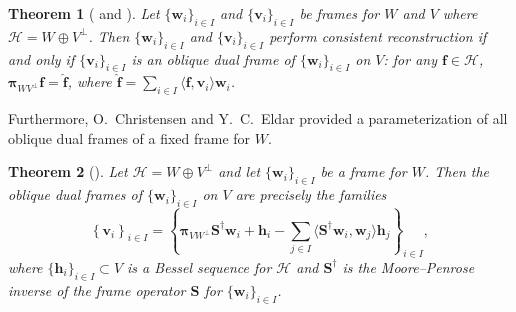 \documentclass{amsart}
\numberwithin{equation}{section}
\newcommand{\bpi}{{\boldsymbol{\pi}}}
\theoremstyle{plain}
\newtheorem{theorem}{Theorem}[section]
\theoremstyle{remark}
\theoremstyle{definition}
\begin{document}
\begin{theorem}[{\cite[Theorem 1]{eldar2003sampling} and \cite[Lemma 3.1]{christensen2004oblique}}] \label{thm:Oblique_dual_characterization}
    Let $\{\mathbf{w}_i\}_{i\in I}$ and $\{\mathbf{v}_i\}_{i\in I}$ be frames for $W$ and $V$ where $\mathcal{H} = W \oplus V^\perp$. Then $\{\mathbf{w}_i\}_{i\in I}$ and $\{\mathbf{v}_i\}_{i\in I}$ perform consistent reconstruction if and only if $\{\mathbf{v}_i\}_{i\in I}$ is an \emph{oblique dual frame} of $\{\mathbf{w}_i\}_{i\in I}$ on $V$: for any $\mathbf{f} \in \mathcal{H}$, $\bpi_{W V^\perp} \mathbf{f} = \hat{\mathbf{f}}$, where $ \hat{\mathbf{f}}= \sum_{i\in I} \langle \mathbf{f}, \mathbf{v}_i \rangle \mathbf{w}_i$.
\end{theorem}


Furthermore, O.~Christensen and Y.~C.~Eldar \cite{christensen2004oblique} provided a parameterization of all oblique dual frames of a fixed frame for $W$.
    \begin{theorem}[{\cite[Theorem 3.2]{christensen2004oblique}}]\label{Oblique_Characterization}
   Let $\mathcal{H} = W \oplus V^\perp$ and let $\{\mathbf{w}_i\}_{i\in I}$ be a frame for $W$. Then the oblique dual frames of $\{\mathbf{w}_i\}_{i\in I}$ on $V$  are precisely the families
\begin{equation*}
    \left\{\mathbf{v}_i\right\}_{i\in I} = \left\{ \bpi_{VW^\perp} \mathbf{S}^\dagger \mathbf{w}_i + \mathbf{h}_i - \sum_{j\in I} \langle \mathbf{S}^\dagger \mathbf{w}_i, \mathbf{w}_j \rangle \mathbf{h}_j \right\}_{i\in I},
\end{equation*}
where $\{\mathbf{h}_i\}_{i\in I} \subset V$ is a Bessel sequence for $\mathcal{H}$ and $\mathbf{S}^\dagger$ is the Moore–Penrose inverse of the frame operator $\mathbf{S}$ for $\{\mathbf{w}_i\}_{i\in I}$. 
\end{theorem}
\end{document}

